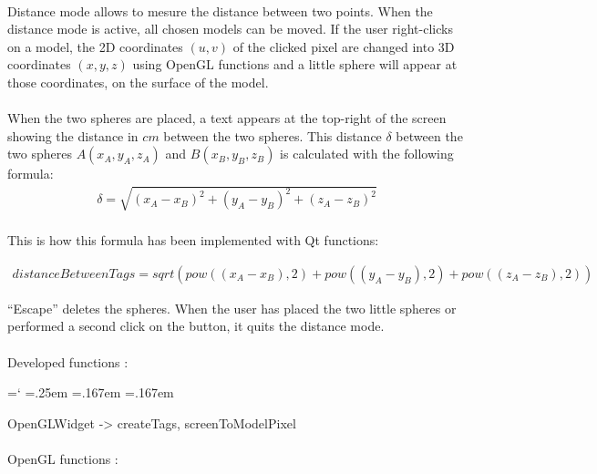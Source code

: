 \documentclass[12pt]{report}
\DeclareRobustCommand*{\ttfamily}{
  \origttfamily
  \hyphenchar\font=`\-\relax
  \fontdimen3\font=.25em\relax
  \fontdimen4\font=.167em\relax
  \fontdimen7\font=.167em\relax
}
\newenvironment{code}{\ttfamily}{}
\begin{document}
\paragraph{}
Distance mode allows to mesure the distance between two points. When the distance mode is active, all chosen models can be moved. If the user right-clicks on a model, the 2D coordinates $(u, v)$ of the clicked pixel are changed into 3D coordinates $(x, y, z)$ using OpenGL functions and a little sphere will appear at those coordinates, on the surface of the model.


\paragraph{}	
	When the two spheres are placed, a text appears at the top-right of the screen showing the distance in $cm$ between the two spheres. This distance $\delta$ between the two spheres $A(x_A, y_A, z_A)$ and $B(x_B, y_B, z_B)$ is calculated with the following formula:
\begin{align}
\delta = \sqrt{(x_A-x_B)^{2} + (y_A-y_B)^{2} + (z_A-z_B)^{2}}
\label{equ:norm}
\end{align}

\paragraph{}
	This is how this formula has been implemented with Qt functions:
	
\begin{align}
distanceBetweenTags = sqrt(pow((x_A-x_B),2) + pow((y_A-y_B),2) + pow((z_A-z_B),2))
\end{align}

``Escape'' deletes the spheres.
When the user has placed the two little spheres or performed a second click on the button, it quits the distance mode.

\paragraph{}
	Developed functions :

	\begin{code}
	OpenGLWidget -> createTags, screenToModelPixel
	\end{code}

\paragraph{}
	OpenGL functions :
\end{document}
